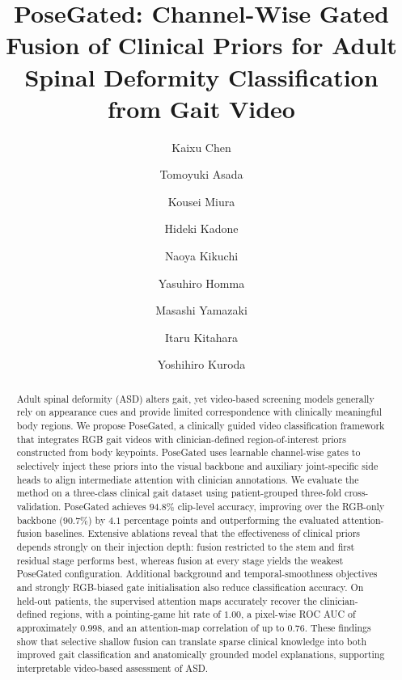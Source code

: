 \documentclass[review,authoryear,times]{elsarticle}
\begin{document}
\linenumbers

\begin{frontmatter}

\title{PoseGated: Channel-Wise Gated Fusion of Clinical Priors for Adult Spinal Deformity Classification from Gait Video}

\author[a]{Kaixu Chen}
\author[b]{Tomoyuki Asada}
\author[b]{Kousei Miura}
\author[b]{Hideki Kadone}
\author[b]{Naoya Kikuchi}
\author[b]{Yasuhiro Homma}
\author[b]{Masashi Yamazaki}
\author[a]{Itaru Kitahara}
\author[c]{Yoshihiro Kuroda}


\begin{abstract}
Adult spinal deformity (ASD) alters gait, yet video-based screening models generally rely on appearance cues and provide limited correspondence with clinically meaningful body regions. We propose PoseGated, a clinically guided video classification framework that integrates RGB gait videos with clinician-defined region-of-interest priors constructed from body keypoints. PoseGated uses learnable channel-wise gates to selectively inject these priors into the visual backbone and auxiliary joint-specific side heads to align intermediate attention with clinician annotations.
We evaluate the method on a three-class clinical gait dataset using patient-grouped three-fold cross-validation. PoseGated achieves $94.8\%$ clip-level accuracy, improving over the RGB-only backbone ($90.7\%$) by $4.1$ percentage points and outperforming the evaluated attention-fusion baselines. Extensive ablations reveal that the effectiveness of clinical priors depends strongly on their injection depth: fusion restricted to the stem and first residual stage performs best, whereas fusion at every stage yields the weakest PoseGated configuration. Additional background and temporal-smoothness objectives and strongly RGB-biased gate initialisation also reduce classification accuracy.
On held-out patients, the supervised attention maps accurately recover the clinician-defined regions, with a pointing-game hit rate of $1.00$, a pixel-wise ROC AUC of approximately $0.998$, and an attention-map correlation of up to $0.76$. These findings show that selective shallow fusion can translate sparse clinical knowledge into both improved gait classification and anatomically grounded model explanations, supporting interpretable video-based assessment of ASD.
\end{abstract}



\end{frontmatter}
\end{document}
